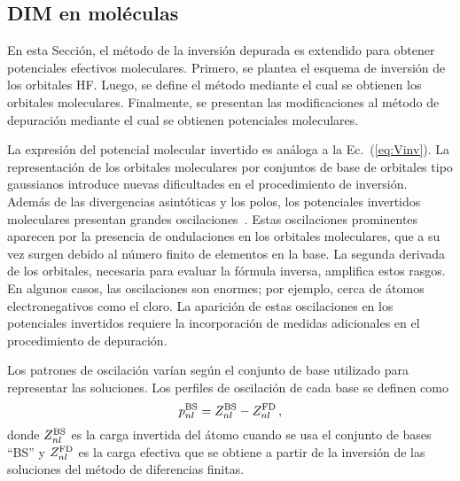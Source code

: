 \subsection{DIM en moléculas}
\label{sec:dimmoleculas}

En esta Sección, el método de la inversión depurada es extendido para 
obtener potenciales efectivos moleculares. Primero, se plantea el 
esquema de inversión de los orbitales HF. Luego, se define el método 
mediante el cual se obtienen los orbitales moleculares. Finalmente, se 
presentan las modificaciones al método de depuración mediante el cual 
se obtienen potenciales moleculares.

La expresión del potencial molecular invertido es análoga a la 
Ec.~(\ref{eq:Vinv}). La representación de los orbitales moleculares por 
conjuntos de base de orbitales tipo gaussianos introduce nuevas 
dificultades en el procedimiento de inversión. Además de las 
divergencias asintóticas y los polos, los potenciales invertidos 
moleculares presentan grandes oscilaciones~\cite{Schipper:97,Jacob:11,
Gaiduk:13}. Estas oscilaciones prominentes aparecen por la 
presencia de ondulaciones en los orbitales moleculares, que a su vez 
surgen debido al número finito de elementos en la base. La segunda 
derivada de los orbitales, necesaria para evaluar la fórmula inversa, 
amplifica estos rasgos. En algunos casos, las oscilaciones son enormes; 
por ejemplo, cerca de átomos electronegativos como el cloro. La 
aparición de estas oscilaciones en los potenciales invertidos requiere 
la incorporación de medidas adicionales en el procedimiento de 
depuración.

Los patrones de oscilación varían según el conjunto de base utilizado
para representar las soluciones. Los perfiles de oscilación de cada base 
se definen como
\begin{equation}
 p_{nl}^{\mbox{\scriptsize BS}} = Z_{nl}^{\mbox{\scriptsize BS}}-
 Z_{nl}^{\mbox{\scriptsize FD}} \,,
 \label{eq:oscillation-prof}
\end{equation}
donde $Z_{nl}^{\mbox{\scriptsize BS}}$ es la carga invertida del átomo
cuando se usa el conjunto de bases ``BS'' y 
$Z_{nl}^{\mbox{\scriptsize FD}}$ es la carga efectiva que se obtiene a 
partir de la inversión de las soluciones del método de diferencias 
finitas.

